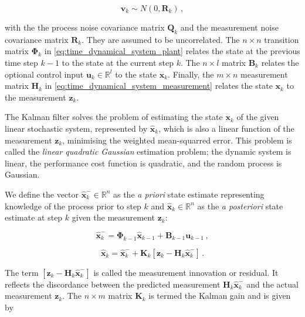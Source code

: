 \begin{equation}\label{eq:measurement_noise}
  \mathbf{v}_{k} \sim N(0,\mathbf{R}_k)\,,
\end{equation}
 
\noindent
with the the process noise covariance matrix $\mathbf{Q}_k$ and the measurement noise covariance matrix $\mathbf{R}_k$. They are assumed to be uncorrelated. The $n\times n$ transition matrix $\mathbf{\Phi}_{k}$ in \ref{eq:time_dynamical_system_plant} relates the state at the previous time step $k-1$ to the state at the current step $k$. The $n\times l$ matrix $\mathbf{B}_{k}$ relates the optional control input $\mathbf{u}_k \in \mathbb{R}^l$ to the state $\mathbf{x}_k$. Finally, the $m\times n$ measurement matrix $\mathbf{H}_{k}$ in \ref{eq:time_dynamical_system_measurement} relates the state $\mathbf{x}_k$ to the measurement $\mathbf{z}_k$.

The Kalman filter solves the problem of estimating the state $\mathbf{x}_k$ of the given linear stochastic system, represented by $\hat{\mathbf{x}}_k$, which is also a linear function of the measurement $\mathbf{z}_k$, minimising the weighted mean-squarred error. This problem is called the \emph{linear quadratic Gaussian} estimation problem; the dynamic system is linear, the performance cost function is quadratic, and the random process is Gaussian.

We define the vector $\hat{\mathbf{x}}^-_k \in \mathbb{R}^n$ as the \emph{a priori} state estimate representing knowledge of the process prior to step $k$ and $\hat{\mathbf{x}}_k \in \mathbb{R}^n$ as the \emph{a posteriori} state estimate at step $k$ given the measurement $\mathbf{z}_k$:

\begin{equation}\label{eq:apriori_estimate}
  \hat{\mathbf{x}}^-_k = \mathbf{\Phi}_{k-1}\hat{\mathbf{x}}_{k-1}+\mathbf{B}_{k-1}\mathbf{u}_{k-1}\,,
\end{equation}

\begin{equation}\label{eq:aposteriori_estimate}
  \hat{\mathbf{x}}_k = \hat{\mathbf{x}}^-_k + \mathbf{K}_{k}[\mathbf{z}_k-\mathbf{H}_{k}\hat{\mathbf{x}}^-_k]\,.
\end{equation}

\noindent
The term $[\mathbf{z}_k-\mathbf{H}_{k}\hat{\mathbf{x}}^-_k]$ is called the measurement innovation or residual. It reflects the discordance between the predicted measurement $\mathbf{H}_{k}\hat{\mathbf{x}}^-_k$ and the actual measurement $\mathbf{z}_k$. The $n\times m$ matrix $\mathbf{K}_{k}$ is termed the Kalman gain and is given by

